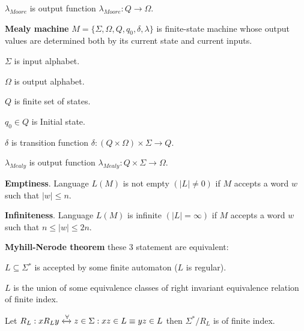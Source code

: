\documentclass[a4paper,10pt]{article}
\newcommand{\alphabet}[1]{\Sigma{#1}}
\begin{document}
\begin{terms}
\begin{terms}
        \item 
        $\lambda_{Moore}$ is output function $\lambda_{Moore}: Q \rightarrow \Omega$.
    \end{terms}

    \item
    \textbf{Mealy machine} $M = \{\Sigma, \Omega, Q, q_0, \delta, \lambda\}$ is finite-state machine whose output values are determined both by its current state and current inputs.

    \begin{terms}
        \item 
        $\alphabet{}$ is input alphabet.

        \item 
        $\Omega$ is output alphabet.

        \item 
        $Q$ is finite set of states.

        \item 
        $q_0 \in Q$ is Initial state.

        \item 
        $\delta$ is transition function $\delta: (Q \times \Omega) \times \alphabet{} \rightarrow Q$.

        \item 
        $\lambda_{Mealy}$ is output function $\lambda_{Mealy}: Q \times \alphabet{} \rightarrow \Omega$.
    \end{terms}

    \item
    \textbf{Emptiness}. Language $L(M)$ is not empty $(|L| \not= 0)$ if $M$ accepts a word $w$ such that $|w| \leq n$.

    \item
    \textbf{Infiniteness}. Language $L(M)$ is infinite $(|L| = \infty)$ if $M$ accepts a word $w$ such that $n \leq |w| \leq 2n$.

    \item
    \textbf{Myhill-Nerode theorem} these 3 statement are equivalent:
    \begin{terms}
        \item
        $L \subseteq \alphabet{}^*$ is accepted by some finite automaton ($L$ is regular).

        \item 
        $L$ is the union of some equivalence classes of right invariant equivalence relation of finite index.

        \item
        Let $R_L: xR_Ly \xleftrightarrow \forall z \in \alphabet{}: xz \in L \equiv yz \in L$ then $\alphabet{}^*/R_L$ is of finite index.
    \end{terms}
    
\end{terms}
\end{document}
